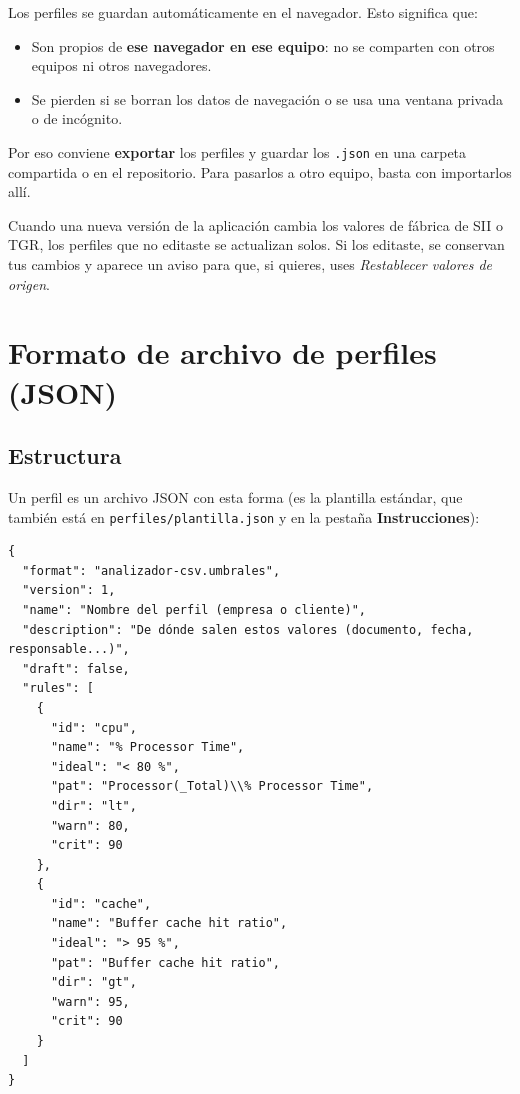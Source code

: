 \documentclass[11pt,a4paper,oneside]{report}
\newcommand{\pestana}[1]{\textsf{\textbf{\color{acento}#1}}}
\begin{document}
Los perfiles se guardan automáticamente en el navegador. Esto significa que:

\begin{aviso}
\begin{itemize}[leftmargin=*]
  \item Son propios de \textbf{ese navegador en ese equipo}: no se comparten
        con otros equipos ni otros navegadores.
  \item Se pierden si se borran los datos de navegación o se usa una ventana
        privada o de incógnito.
\end{itemize}
Por eso conviene \textbf{exportar} los perfiles y guardar los \texttt{.json}
en una carpeta compartida o en el repositorio. Para pasarlos a otro equipo,
basta con importarlos allí.
\end{aviso}

Cuando una nueva versión de la aplicación cambia los valores de fábrica de SII
o TGR, los perfiles que no editaste se actualizan solos. Si los editaste, se
conservan tus cambios y aparece un aviso para que, si quieres, uses
\emph{Restablecer valores de origen}.

\chapter{Formato de archivo de perfiles (JSON)}
\label{cap:json}

\section{Estructura}

Un perfil es un archivo JSON con esta forma (es la plantilla estándar, que
también está en \texttt{perfiles/plantilla.json} y en la pestaña
\pestana{Instrucciones}):

\begin{lstlisting}
{
  "format": "analizador-csv.umbrales",
  "version": 1,
  "name": "Nombre del perfil (empresa o cliente)",
  "description": "De dónde salen estos valores (documento, fecha, responsable...)",
  "draft": false,
  "rules": [
    {
      "id": "cpu",
      "name": "% Processor Time",
      "ideal": "< 80 %",
      "pat": "Processor(_Total)\\% Processor Time",
      "dir": "lt",
      "warn": 80,
      "crit": 90
    },
    {
      "id": "cache",
      "name": "Buffer cache hit ratio",
      "ideal": "> 95 %",
      "pat": "Buffer cache hit ratio",
      "dir": "gt",
      "warn": 95,
      "crit": 90
    }
  ]
}
\end{lstlisting}
\end{document}
